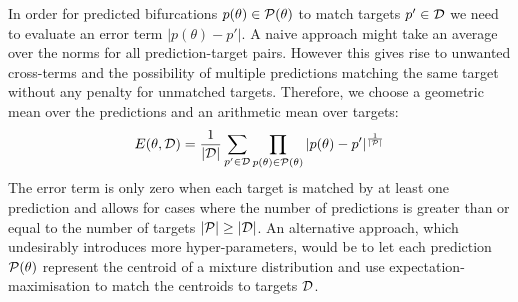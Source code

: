 \documentclass{article}
\begin{document}
In order for predicted bifurcations $p(\theta)\in\mathcal{P}(\theta)$ to match targets $p'\in\mathcal{D}$ we need to evaluate an error term $|p(\theta)-p'|$. A naive approach might take an average over the norms for all prediction-target pairs. However this gives rise to unwanted cross-terms and the possibility of multiple predictions matching the same target without any penalty for unmatched targets. Therefore, we choose a geometric mean over the predictions and an arithmetic mean over targets:
\begin{equation}
    E(\theta, \mathcal{D}) = \frac{1}{|\mathcal{D}|}\sum_{p'\in\mathcal{D}}
    \prod_{p(\theta)\in\mathcal{P}(\theta)}|p(\theta)-p'|
    ^{\frac{1}{|\mathcal{P}|}}
    \label{eq:error}
\end{equation}
The error term is only zero when each target is matched by at least one prediction and allows for cases where the number of predictions is greater than or equal to the number of targets $|\mathcal{P}| \geq |\mathcal{D}|$. An alternative approach, which undesirably introduces more hyper-parameters, would be to let each prediction $\mathcal{P}(\theta)$ represent the centroid of a mixture distribution and use expectation-maximisation to match the centroids to targets $\mathcal{D}$.
\end{document}
